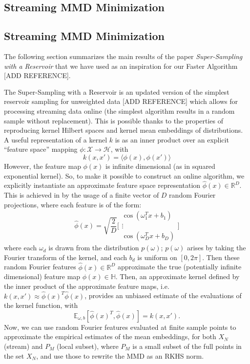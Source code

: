 \documentclass{article}
\begin{document}
	
	\subsection{Streaming MMD Minimization}
	
	\subsection{Streaming MMD Minimization}
	
	The following section summarizes the main results of the paper \textit{Super-Sampling with a Reservoir} \cite{streaming} that we have used as an inspiration for our Faster Algorithm [ADD REFERENCE]. 
	
	The Super-Sampling with a Reservoir is an updated version of the simplest reservoir sampling for unweighted data [ADD REFERENCE] which allows for processing streaming data online (the simplest algorithm results in a random sample without replacement). This is possible thanks to the properties of reproducing kernel Hilbert spaces and kernel mean embeddings of distributions. A useful representation of a kernel $k$ is as an inner product over an explicit ``feature space'' mapping $\phi: \mathcal{X} \rightarrow \mathcal{H}$, with
	\begin{equation*}
	k(x, x') = \langle \phi(x), \phi(x') \rangle
	\end{equation*}
	However, the feature map $\phi(x)$ is infinite dimensional (as in squared exponential kernel). So, to make it possible to construct an online algorithm, we explicitly instantiate an approximate feature space representation $\hat{\phi}(x) \in \mathbb{R}^D$. This is achieved in \cite{streaming} by the usage of a finite vector of $D$ random Fourier projections, where each feature is of the form:
	\begin{equation*}
	\hat{\phi}(x) = \sqrt{\frac{2}{D}} \Bigg[
	\begin{array}{c} \cos (\omega_1^T x + b_1)  \\ \vdots \\ \cos (\omega_D^T x + b_D) \end{array} \Bigg]
	\end{equation*}
	where each $\omega_d$ is drawn from the distribution $p(\omega)$; $p(\omega)$ arises by taking the Fourier transform of the kernel, and each $b_d$ is uniform on $[0, 2\pi]$. Then these random Fourier features $\hat{\phi}(x) \in \mathbb{R}^D$ approximate the true (potentially infinite dimensional) feature map $\phi(x) \in \mathbb{H}$. Then, an approximate kernel defined by the inner product of the approximate feature maps, i.e. $k(x, x') \approx \hat{\phi}(x)^T \hat{\phi}(x)$, provides an unbiased estimate of the evaluations of the kernel function, with
	\begin{equation*}
	\mathbb{E}_{\omega, b}[\hat{\phi}(x)^T, \hat{\phi}(x)] = k(x, x').
	\end{equation*}
	Now, we can use random Fourier features evaluated at finite sample points to approximate the empirical estimates of the mean embeddings, for both $X_N$ (stream) and $P_M$ (local subset), where $P_M$ is a small subset of the full points in the set $X_N$, and use those to rewrite the MMD as an RKHS norm. 
	
\end{document}
